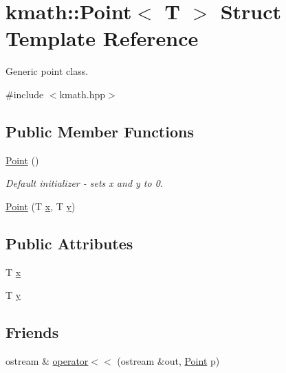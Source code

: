 \hypertarget{structkmath_1_1_point}{\section{kmath\-:\-:Point$<$ T $>$ Struct Template Reference}
\label{structkmath_1_1_point}
}


Generic point class.  




{\ttfamily \#include $<$kmath.\-hpp$>$}

\subsection*{Public Member Functions}
\begin{DoxyCompactItemize}
\item 
\hyperlink{structkmath_1_1_point_ac63797a27504bd994b0a5756ffc37428}{Point} ()
\begin{DoxyCompactList}\small\item\em Default initializer -\/ sets {\ttfamily x} and {\ttfamily y} to 0. \end{DoxyCompactList}\item 
\hyperlink{structkmath_1_1_point_a174f5ab875237f2d5c443fef527e2804}{Point} (T \hyperlink{structkmath_1_1_point_a367f7e04a97fde0889e5dea495d98acd}{x}, T \hyperlink{structkmath_1_1_point_a9d69fcd8c019e361cce763e45b8b1698}{y})
\end{DoxyCompactItemize}
\subsection*{Public Attributes}
\begin{DoxyCompactItemize}
\item 
T \hyperlink{structkmath_1_1_point_a367f7e04a97fde0889e5dea495d98acd}{x}
\item 
T \hyperlink{structkmath_1_1_point_a9d69fcd8c019e361cce763e45b8b1698}{y}
\end{DoxyCompactItemize}
\subsection*{Friends}
\begin{DoxyCompactItemize}
\item 
ostream \& \hyperlink{structkmath_1_1_point_ac6ce84350ccb7814a8ebbc3b93fa0fcf}{operator$<$$<$} (ostream \&out, \hyperlink{structkmath_1_1_point}{Point} p)
\end{DoxyCompactItemize}


